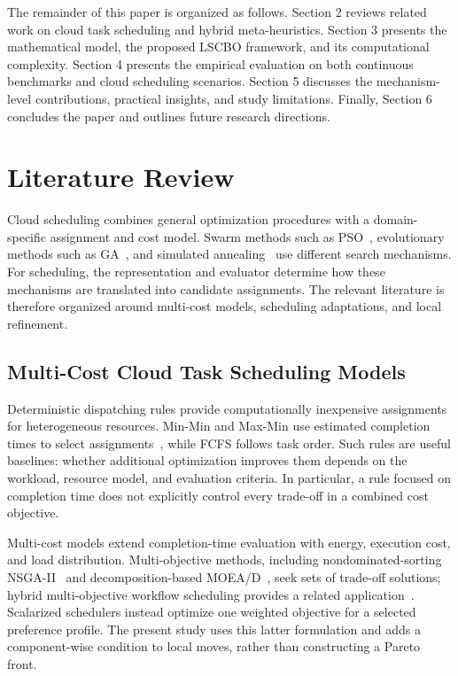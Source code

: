 \documentclass[pdflatex,onecolumn,sn-mathphys-num]{sn-jnl}
\begin{document}
The remainder of this paper is organized as follows. Section 2 reviews related work on cloud task scheduling and hybrid meta-heuristics. Section 3 presents the mathematical model, the proposed LSCBO framework, and its computational complexity. Section 4 presents the empirical evaluation on both continuous benchmarks and cloud scheduling scenarios. Section 5 discusses the mechanism-level contributions, practical insights, and study limitations. Finally, Section 6 concludes the paper and outlines future research directions.

\section{Literature Review}\label{sec:literature}

Cloud scheduling combines general optimization procedures with a domain-specific assignment and cost model. Swarm methods such as PSO~\cite{Kennedy1995}, evolutionary methods such as GA~\cite{Goldberg1989}, and simulated annealing~\cite{Kirkpatrick1983} use different search mechanisms. For scheduling, the representation and evaluator determine how these mechanisms are translated into candidate assignments. The relevant literature is therefore organized around multi-cost models, scheduling adaptations, and local refinement.

\subsection{Multi-Cost Cloud Task Scheduling Models}

Deterministic dispatching rules provide computationally inexpensive assignments for heterogeneous resources. Min-Min and Max-Min use estimated completion times to select assignments~\cite{Etminani2007}, while FCFS follows task order. Such rules are useful baselines: whether additional optimization improves them depends on the workload, resource model, and evaluation criteria. In particular, a rule focused on completion time does not explicitly control every trade-off in a combined cost objective.

Multi-cost models extend completion-time evaluation with energy, execution cost, and load distribution. Multi-objective methods, including nondominated-sorting NSGA-II~\cite{Deb2002} and decomposition-based MOEA/D~\cite{Zhang2007}, seek sets of trade-off solutions; hybrid multi-objective workflow scheduling provides a related application~\cite{Verma2017}. Scalarized schedulers instead optimize one weighted objective for a selected preference profile. The present study uses this latter formulation and adds a component-wise condition to local moves, rather than constructing a Pareto front.
\end{document}
